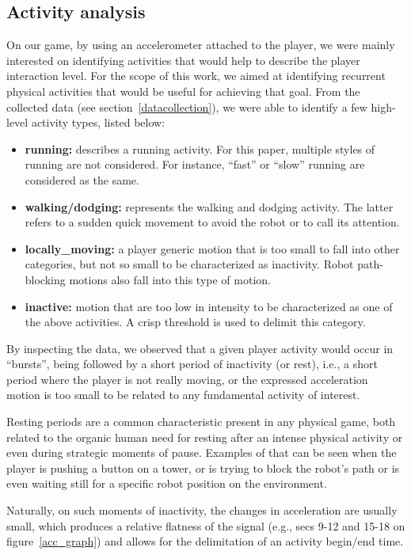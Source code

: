 \subsection{Activity analysis}\label{activityanalysis}

On our game, by using an accelerometer attached to the player, we were mainly interested on identifying activities that would help to describe the player interaction level. For the scope of this work, we aimed at identifying recurrent physical activities that would be useful for achieving that goal. From the collected data (see section~\ref{datacollection}), we were able to identify a few high-level activity types, listed below:

\begin{itemize}
\item  \textbf{running:} describes a running activity. For this paper, multiple styles of running are not considered. For instance, ``fast'' or ``slow'' running are considered as the same.
\item \textbf{walking/dodging:} represents the walking and dodging activity. The latter refers to a sudden quick movement to avoid the robot or to call its attention.
\item  \textbf{locally\_moving:} a player generic motion that is too small to fall into other categories, but not so small to be characterized as inactivity. Robot path-blocking motions also fall into this type of motion.
\item  \textbf{inactive:} motion that are too low in intensity to be characterized as one of the above activities. A crisp threshold is used to delimit this category. 
\end{itemize}

By inspecting the data, we observed that a given player activity would occur in ``bursts'', being followed by a short period of inactivity (or rest), i.e., a short period where the player is not really moving, or the expressed acceleration motion is too small to be related to any fundamental activity of interest.

Resting periods are a common characteristic present in any physical game, both related to the organic human need for resting after an intense physical activity or even during strategic moments of pause. Examples of that can be seen when the player is pushing a button on a tower, or is trying to block the robot's path or is even waiting still for a specific robot position on the environment.

Naturally, on such moments of inactivity, the changes in acceleration are usually small, which produces a relative flatness of the signal (e.g., secs 9-12 and 15-18 on figure~\ref{acc_graph}) and allows for the delimitation of an activity begin/end time.

